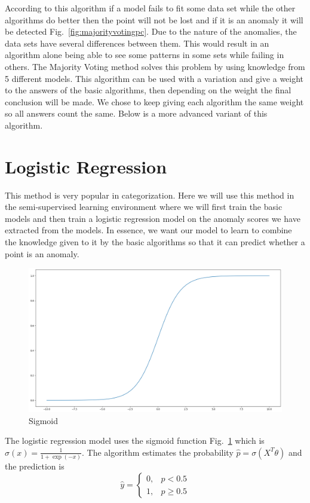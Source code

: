 \documentclass[a4paper,12pt]{report}
\theoremstyle{definitionNODot}
\begin{document}
	
	
	According to this algorithm if a model fails to fit some data set while the other algorithms do better then the point will not be lost and if it is an anomaly it will be detected Fig.~\ref{fig:majorityvotingpc}. Due to the nature of the anomalies, the data sets have several differences between them. This would result in an algorithm alone being able to see some patterns in some sets while failing in others. The Majority Voting method solves this problem by using knowledge from 5 different models. This algorithm can be used with a variation and give a weight to the answers of the basic algorithms, then depending on the weight the final conclusion will be made. We chose to keep giving each algorithm the same weight so all answers count the same. Below is a more advanced variant of this algorithm.
	
	\section{Logistic Regression}
	This method is very popular in categorization. Here we will use this method in the semi-supervised learning environment where we will first train the basic models and then train a logistic regression model on the anomaly scores we have extracted from the models. In essence, we want our model to learn to combine the knowledge given to it by the basic algorithms so that it can predict whether a point is an anomaly.
	
	\begin{figure}[h]
		\centering
		\includegraphics[width=\textwidth]{sigmoid.png}
		\caption{Sigmoid}
		\label{fig:sigmoid}
	\end{figure}
	
	The logistic regression model uses the sigmoid function Fig.~\ref{fig:sigmoid} which is $\sigma(x) = \frac{1}{1+\exp(-x)}$. The algorithm estimates the probability $\hat{p}=\sigma(X^T\theta)$ and the prediction is
	\begin{equation*}
		\hat{y} = \begin{cases}
			0, &\hat{p}<0.5\\
			1, &\hat{p}\geq 0.5
		\end{cases}
	\end{equation*}
	
\end{document}
